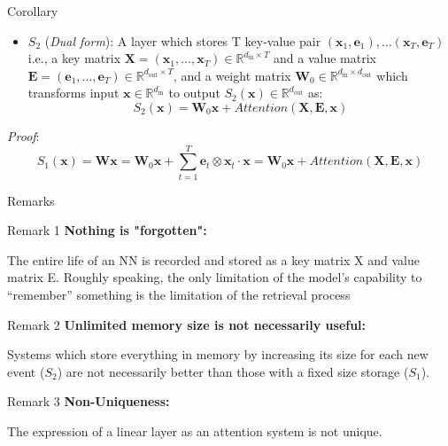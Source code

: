 \documentclass{beamer}
\begin{document}
\begin{block}{Corollary}
    \begin{itemize}
        \item $S_2$ (\textit{Dual form}):  A layer which stores T key-value pair $(\mathbf{x}_1, \mathbf{e}_1), \ldots (\mathbf{x}_T, \mathbf{e}_T)$ i.e., a key matrix $\mathbf{X} = (\mathbf{x}_1, \ldots, \mathbf{x}_T)\in\mathbb{R}^{d_{\text{in}}\times T}$ and a value matrix $\mathbf{E} = (\mathbf{e}_1, \ldots, \mathbf{e}_T)\in\mathbb{R}^{d_{\text{out}}\times T}$, and a weight matrix $\mathbf{W}_0 \in \mathbb{R}^{d_{\text{in}}\times d_{\text{out}}}$ which transforms input $\mathbf{x}\in\mathbb{R}^{d_{\text{in}}}$ to output $S_2(\mathbf{x})\in\mathbb{R}^{d_{\text{out}}}$ as:
        \begin{equation}\label{dual_form}
            S_2(\mathbf{x}) = \mathbf{W}_0\mathbf{x} + Attention(\mathbf{X}, \mathbf{E}, \mathbf{x})
        \end{equation}
    \end{itemize}
    \textit{Proof}:
    \begin{equation*}
        S_1(\mathbf{x}) = \mathbf{W}\mathbf{x} = \mathbf{W}_0\mathbf{x} + \sum_{t=1}^T \mathbf{e}_t \otimes \mathbf{x}_t\cdot\mathbf{x} = \mathbf{W}_0\mathbf{x} + Attention(\mathbf{X}, \mathbf{E}, \mathbf{x})
    \end{equation*}
\end{block}

\begin{frame}{Remarks}
    \begin{block}{Remark 1}
        \textbf{Nothing is "forgotten":}

        The entire life of an NN is recorded and stored as a key matrix X and value matrix E. Roughly speaking, the only limitation of the model’s capability to “remember” something is the limitation of the retrieval process
    \end{block}
    \begin{block}{Remark 2}
        \textbf{Unlimited memory size is not necessarily useful:}

        Systems which store everything in memory by increasing its size for each new event ($S_2$) are not necessarily better than those with a fixed size storage ($S_1$). 
    \end{block}
    \begin{block}{Remark 3}
        \textbf{Non-Uniqueness:}

        The expression of a linear layer as an attention system is not unique.
    \end{block}
\end{frame}
\end{document}
